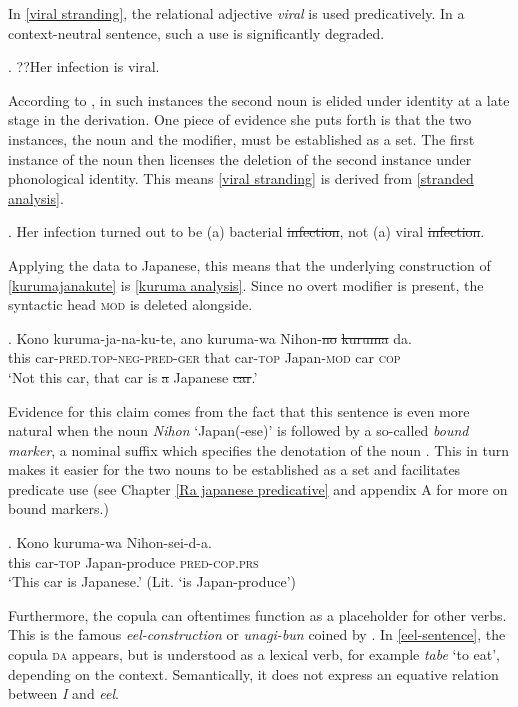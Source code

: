 \documentclass [output=book,colorlinks,citecolor=brown]{langscibook}
\begin{document}
In \ref{viral stranding}, the relational adjective \textit{viral} is used predicatively. In a context-neutral sentence, such a use is significantly degraded.

\ex. ??Her infection is viral.

According to \citet[255]{levi:1978:syntax}, in such instances the second noun is elided under identity at a late stage in the derivation. One piece of evidence she puts forth is that the two instances, the noun and the modifier, must be established as a set. The first instance of the noun then licenses the deletion of the second instance under phonological identity. This means \ref{viral stranding} is derived from \ref{stranded analysis}.

\ex. Her infection turned out to be (a) bacterial \st{infection}, not (a) viral \st{infection}. \null \hfill \citep[254]{levi:1978:syntax} \label{stranded analysis}

Applying the data to Japanese, this means that the underlying construction of \ref{kurumajanakute} is \ref{kuruma analysis}. Since no overt modifier is present, the syntactic head \textsc{mod} is deleted alongside.

\exg. Kono kuruma-ja-na-ku-te, ano kuruma-wa Nihon-\st{no} \st{kuruma} da.\\
this car-\textsc{pred.top-neg-pred-ger} that car-\textsc{top} Japan-\textsc{mod} car \textsc{cop}\\
`Not this car, that car is \st{a} Japanese \st{car}.’ \label{kuruma analysis}

Evidence for this claim comes from the fact that this sentence is even more natural when the noun \textit{Nihon} `Japan(-ese)’ is followed by a so-called \textit{bound marker}, a nominal suffix which specifies the denotation of the noun \citep{nagano:2016:are, shimada:2018:relational}. This in turn makes it easier for the two nouns to be established as a set and facilitates predicate use (see Chapter \ref{Ra japanese predicative} and appendix A for more on bound markers.) %

\exg. Kono kuruma-wa Nihon-sei-d-a.\\
this car-\textsc{top} Japan-produce \textsc{pred-cop.prs}\\
`This car is Japanese.’ (Lit. `is Japan-produce’)

Furthermore, the copula can oftentimes function as a placeholder for other verbs. This is the famous \textit{eel-construction} or \textit{unagi-bun} coined by \citet{okutsu:1978:boku}. In \ref{eel-sentence}, the copula \textsc{da} appears, but is understood as a lexical verb, for example \textit{tabe} `to eat’, depending on the context. Semantically, it does not express an equative relation between \textit{I} and \textit{eel}. %
\end{document}
